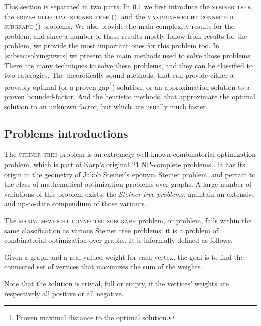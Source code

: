 	This section is separated in two parts.
	In \cref{subsec:mwcsintro} we first introduce the \textsc{steiner tree}, the \textsc{prize-collecting steiner tree} (\pcst{}), and the \textsc{maximum-weight connected subgraph} (\mwcs{}) problems.
	We also provide the main complexity results for the \mwcs{} problem, and since a number of those results mostly follow from results for the \pcst{} problem, we provide the most important ones for this problem too.
	In \cref{subsec:solvingmwcs} we present the main methods used to solve those problems.
	There are many techniques to solve these problems, and they can be classified to two caterogies.
	The theoretically-sound methods, that can provide either a provably optimal (or a proven gap\footnote{Proven maximal distance to the optimal solution.}) solution, or an approximation solution to a proven bounded-factor.
	And the heuristic methods, that approximate the optimal solution to an unknown factor, but which are usually much faster.

	\subsection{Problems introductions}
	\label{subsec:mwcsintro}

	The \textsc{steiner tree} problem is an extremely well known combinatorial optimization problem, which is part of Karp's original 21 NP-complete problems \parencite{karp1972reducibility}.
	It has its origin in the geometry of Jakob Steiner's eponym Steiner problem, and pertain to the class of mathematical optimization problems over graphs.
	A large number of variations of this problem exists: the \emph{Steiner tree problems}.
	\Textcite{hauptmann2014compendium} maintain an extensive and up-to-date compendium of those variants.

	The \textsc{maximum-weight connected subgraph} problem, or \mwcs{} problem, falls within the same classification as various Steiner tree problems: it is a problem of combinatorial optimization over graphs.
	It is informally defined as follows.

	Given a graph and a real-valued weight for each vertex, the goal is to find the connected set of vertices that maximizes the sum of the weights.

	Note that the solution is trivial, full or empty, if the vertices' weights are respectively all positive or all negative.

